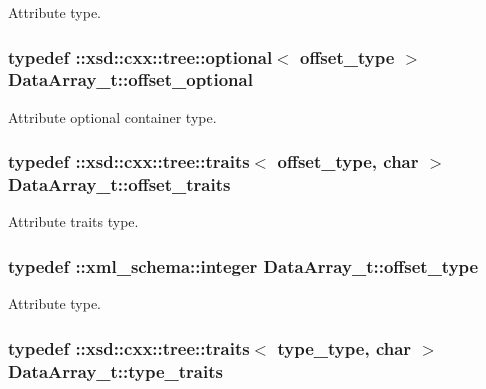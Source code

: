 Attribute type. 

\hypertarget{classDataArray__t_a4bc33060e7c386b658c752347ac5f03e}{
\subsubsection[{offset\+\_\+optional}]{\setlength{\rightskip}{0pt plus 5cm}typedef \+::xsd\+::cxx\+::tree\+::optional$<$ {\bf offset\+\_\+type} $>$ {\bf Data\+Array\+\_\+t\+::offset\+\_\+optional}}}\label{classDataArray__t_a4bc33060e7c386b658c752347ac5f03e}


Attribute optional container type. 

\hypertarget{classDataArray__t_a2e3e1a5de665fc64a3d86fd94bb1af0f}{
\subsubsection[{offset\+\_\+traits}]{\setlength{\rightskip}{0pt plus 5cm}typedef \+::xsd\+::cxx\+::tree\+::traits$<$ {\bf offset\+\_\+type}, char $>$ {\bf Data\+Array\+\_\+t\+::offset\+\_\+traits}}}\label{classDataArray__t_a2e3e1a5de665fc64a3d86fd94bb1af0f}


Attribute traits type. 

\hypertarget{classDataArray__t_a7b840c5f08bd2c65cd3c5e24ad132cfb}{
\subsubsection[{offset\+\_\+type}]{\setlength{\rightskip}{0pt plus 5cm}typedef \+::{\bf xml\+\_\+schema\+::integer} {\bf Data\+Array\+\_\+t\+::offset\+\_\+type}}}\label{classDataArray__t_a7b840c5f08bd2c65cd3c5e24ad132cfb}


Attribute type. 

\hypertarget{classDataArray__t_af1dc5f097a8645ae42b57eb3a0b10fa2}{
\subsubsection[{type\+\_\+traits}]{\setlength{\rightskip}{0pt plus 5cm}typedef \+::xsd\+::cxx\+::tree\+::traits$<$ {\bf type\+\_\+type}, char $>$ {\bf Data\+Array\+\_\+t\+::type\+\_\+traits}}}\label{classDataArray__t_af1dc5f097a8645ae42b57eb3a0b10fa2}


